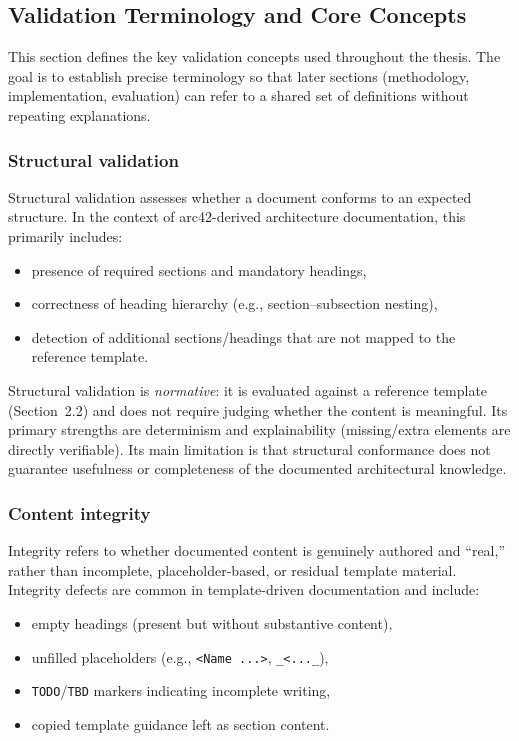 \subsection{Validation Terminology and Core Concepts}
This section defines the key validation concepts used throughout the thesis. The goal is to establish precise terminology so that later sections (methodology, implementation, evaluation) can refer to a shared set of definitions without repeating explanations.

\subsubsection{Structural validation}
Structural validation assesses whether a document conforms to an expected structure. In the context of arc42-derived architecture documentation, this primarily includes:
\begin{itemize}
    \item presence of required sections and mandatory headings,
    \item correctness of heading hierarchy (e.g., section--subsection nesting),
    \item detection of additional sections/headings that are not mapped to the reference template.
\end{itemize}

Structural validation is \emph{normative}: it is evaluated against a reference template (Section~2.2) and does not require judging whether the content is meaningful. Its primary strengths are determinism and explainability (missing/extra elements are directly verifiable). Its main limitation is that structural conformance does not guarantee usefulness or completeness of the documented architectural knowledge.

\subsubsection{Content integrity}
Integrity refers to whether documented content is genuinely authored and ``real,'' rather than incomplete, placeholder-based, or residual template material. Integrity defects are common in template-driven documentation and include:
\begin{itemize}
    \item empty headings (present but without substantive content),
    \item unfilled placeholders (e.g., \texttt{<Name ...>}, \texttt{\_<...\>\_}),
    \item \texttt{TODO}/\texttt{TBD} markers indicating incomplete writing,
    \item copied template guidance left as section content.
\end{itemize}

